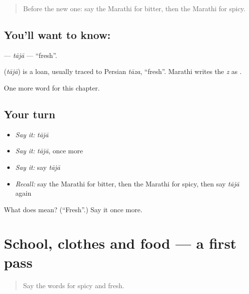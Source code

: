 \begin{quote}
Before the new one: say the Marathi for bitter, then the Marathi for spicy.
\end{quote}

\subsection*{You'll want to know: }
\textbf{} — \emph{tājā} — \textquotedblleft{}fresh\textquotedblright{}.

\begin{cousinweb}
\textbf{} (\emph{tājā}) is a loan, usually traced to Persian \emph{tāza}, \textquotedblleft{}fresh\textquotedblright{}. Marathi writes the \emph{z} as \textbf{}.
\end{cousinweb}

\begin{grammarlens}[title={What you've built}]
One more word for this chapter.
\end{grammarlens}

\subsection*{Your turn}
\begin{itemize}
\raggedright
  \item \emph{Say it:} \emph{tājā}
  \item \emph{Say it:} \emph{tājā}, once more
  \item \emph{Say it:} say \emph{tājā}
  \item \emph{Recall:} say the Marathi for bitter, then the Marathi for spicy, then say \emph{tājā} again
\end{itemize}

\begin{tcolorbox}[breakable,colback=teal!4,colframe=teal!35!black,title={Before you move on}]
What does  mean? (\textquotedblleft{}Fresh\textquotedblright{}.) Say it once more.
\end{tcolorbox}
\section[(dialogue)]{School, clothes and food — a first pass}

\label{lesson:MR-R149-first-pass-school-clothes-and-food}



\begin{quote}
Say the words for spicy and fresh.
\end{quote}

